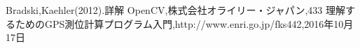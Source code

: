 \documentclass[twocolumn,11pt]{sotsuken_abst}
\begin{document}
\begin{thebibliography}{8}
 Bradski,Kaehler(2012).詳解 OpenCV,株式会社オライリー・ジャパン,433
 理解するためのGPS測位計算プログラム入門,http://www.enri.go.jp/fks442,2016年10月17日%
\end{thebibliography}

\end{document}
